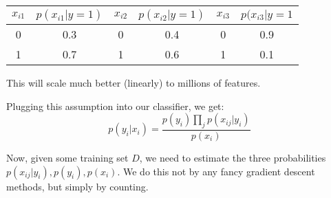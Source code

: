 \documentclass{article}
\begin{document}
\begin{tabular}{|c|c||c|c||c|c|}
\hline
$x_{i1}$ & $p(x_{i1}|y=1)$ & $x_{i2}$ & $p(x_{i2}|y=1)$ & $x_{i3}$ & $p(x_{i3}|y=1$\\
\hline
0 & 0.3 & 0 & 0.4 & 0 & 0.9\\
1 & 0.7 & 1 & 0.6 & 1 & 0.1\\
\hline
\end{tabular}

This will scale much better (linearly) to millions of features.

Plugging this assumption into our classifier, we get:
$$
p(y_i|x_i) = \frac{p(y_i)\prod_j p(x_{ij}|y_i)}{p(x_i)}
$$

Now, given some training set $D$, we need to estimate the three probabilities $p(x_{ij}|y_i), p(y_i), p(x_i)$. We do this not by any fancy gradient descent methods, but simply by counting.

\vspace{.1in}
\end{document}
